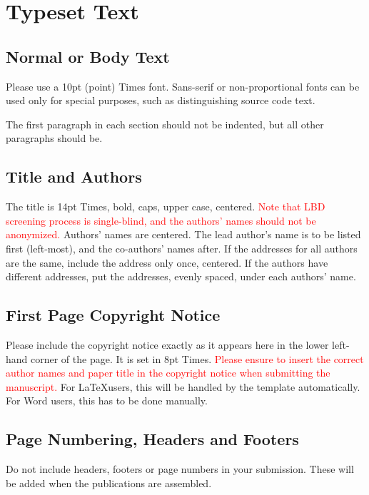 \documentclass{article}
\begin{document}
\section{Typeset Text}\label{sec:typeset_text}

\subsection{Normal or Body Text}\label{subsec:body}

Please use a 10pt (point) Times font. Sans-serif or non-proportional fonts
can be used only for special purposes, such as distinguishing source code text.

The first paragraph in each section should not be indented, but all other paragraphs should be.

\subsection{Title and Authors}

The title is 14pt Times, bold, caps, upper case, centered.
\textcolor{red}{Note that LBD screening process is single-blind, and the authors' names should not be anonymized.}
Authors' names are centered.
The lead author's name is to be listed first (left-most), and the co-authors' names after.
If the addresses for all authors are the same, include the address only once, centered.
If the authors have different addresses, put the addresses, evenly spaced, under each authors' name.

\subsection{First Page Copyright Notice}

Please include the copyright notice exactly as it appears here in the lower left-hand corner of the page.
It is set in 8pt Times. \textcolor{red}{Please ensure to insert the correct author names and paper title in the copyright notice when submitting the manuscript.} For \LaTeX users, this will be handled by the template automatically. For Word users, this has to be done manually.


\subsection{Page Numbering, Headers and Footers}

Do not include headers, footers or page numbers in your submission.
These will be added when the publications are assembled.
\end{document}
